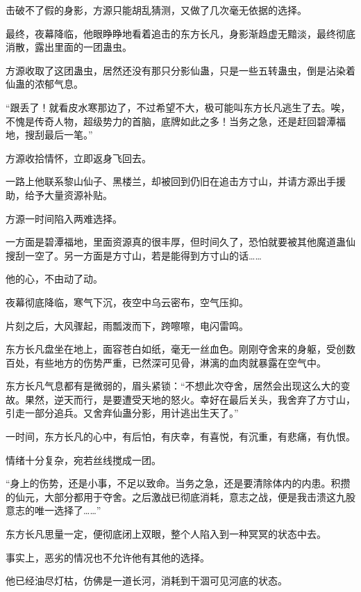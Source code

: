 
\begin{this_body}

击破不了假的身影，方源只能胡乱猜测，又做了几次毫无依据的选择。

最终，夜幕降临，他眼睁睁地看着追击的东方长凡，身影渐趋虚无黯淡，最终彻底消散，露出里面的一团蛊虫。

方源收取了这团蛊虫，居然还没有那只分影仙蛊，只是一些五转蛊虫，倒是沾染着仙蛊的浓郁气息。

“跟丢了！就看皮水寒那边了，不过希望不大，极可能叫东方长凡逃生了去。唉，不愧是传奇人物，超级势力的首脑，底牌如此之多！当务之急，还是赶回碧潭福地，搜刮最后一笔。”

方源收拾情怀，立即返身飞回去。

一路上他联系黎山仙子、黑楼兰，却被回到仍旧在追击方寸山，并请方源出手援助，给予大量资源补贴。

方源一时间陷入两难选择。

一方面是碧潭福地，里面资源真的很丰厚，但时间久了，恐怕就要被其他魔道蛊仙搜刮一空了。另一方面是方寸山，若是能得到方寸山的话……

他的心，不由动了动。

夜幕彻底降临，寒气下沉，夜空中乌云密布，空气压抑。

片刻之后，大风骤起，雨瓢泼而下，跨嚓嚓，电闪雷鸣。

东方长凡盘坐在地上，面容苍白如纸，毫无一丝血色。刚刚夺舍来的身躯，受创数百处，有些地方的伤势严重，已然深可见骨，淋漓的血肉就暴露在空气中。

东方长凡气息都有是微弱的，眉头紧锁：“不想此次夺舍，居然会出现这么大的变故。果然，逆天而行，是要遭受天地的怒火。幸好在最后关头，我舍弃了方寸山，引走一部分追兵。又舍弃仙蛊分影，用计逃出生天了。”

一时间，东方长凡的心中，有后怕，有庆幸，有喜悦，有沉重，有悲痛，有仇恨。

情绪十分复杂，宛若丝线搅成一团。

“身上的伤势，还是小事，不足以致命。当务之急，还是要清除体内的内患。积攒的仙元，大部分都用于夺舍。之后激战已彻底消耗，意志之战，便是我击溃这九股意志的唯一选择了……”

东方长凡思量一定，便彻底闭上双眼，整个人陷入到一种冥冥的状态中去。

事实上，恶劣的情况也不允许他有其他的选择。

他已经油尽灯枯，仿佛是一道长河，消耗到干涸可见河底的状态。


\end{this_body}
